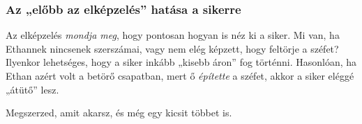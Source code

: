 
\subsubsection{Az „előbb az elképzelés” hatása a sikerre}

Az elképzelés \emph{mondja meg}, hogy pontosan hogyan is néz ki a siker. Mi van, ha Ethannek nincsenek szerszámai, vagy nem elég képzett, hogy feltörje a széfet? Ilyenkor lehetséges, hogy a siker inkább „kisebb áron” fog történni. Hasonlóan, ha Ethan azért volt a betörő csapatban, mert ő \emph{építette} a széfet, akkor a siker eléggé „átütő” lesz.


Megszerzed, amit akarsz, és még egy kicsit többet is.

